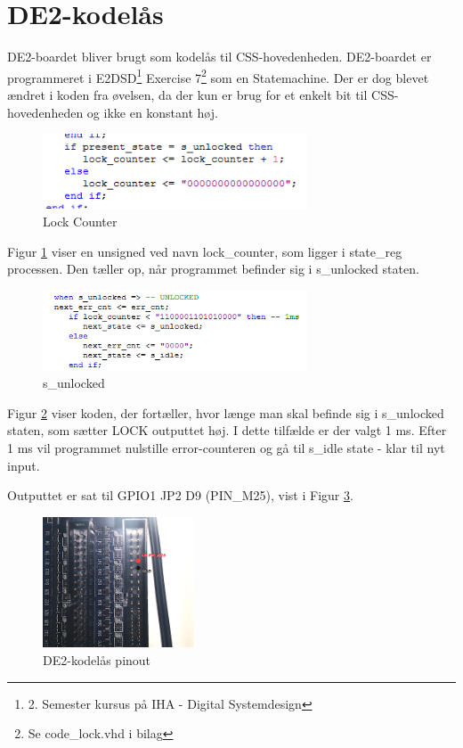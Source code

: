 \section{DE2-kodelås}

DE2-boardet bliver brugt som kodelås til CSS-hovedenheden. DE2-boardet er programmeret i E2DSD\footnote{2. Semester kursus på IHA - Digital Systemdesign} Exercise 7\footnote{Se code\_lock.vhd i bilag} som en Statemachine. Der er dog blevet ændret i koden fra øvelsen, da der kun er brug for et enkelt bit til CSS-hovedenheden og ikke en konstant høj. 

\begin{figure}[H]
	\centering
	\includegraphics[width=0.70\textwidth]{billeder/HWdesign/code_lock_counter}
	\caption{Lock Counter}
	\label{code:code_lock}
\end{figure}

Figur \ref{code:code_lock} viser en unsigned ved navn lock\_counter, som ligger i state\_reg processen. Den tæller op, når programmet befinder sig i s\_unlocked staten.

\begin{figure}[H]
	\centering
	\includegraphics[width=0.70\textwidth]{billeder/HWdesign/code_lock_s_unlocked_state}
	\caption{s\_unlocked}
	\label{code:s_unlocked}
\end{figure}

Figur \ref{code:s_unlocked} viser koden, der fortæller, hvor længe man skal befinde sig i s\_unlocked staten, som sætter LOCK outputtet høj. I dette tilfælde er der valgt 1 ms. Efter 1 ms vil programmet nulstille error-counteren og gå til s\_idle state - klar til nyt input.

Outputtet er sat til GPIO1 JP2 D9 (PIN\_M25), vist i Figur \ref{code:code_lock_pinout}.

\begin{figure}[H]
	\centering
	\includegraphics[width=0.40\textwidth]{billeder/HWdesign/code_lock_pinout}
	\caption{DE2-kodelås pinout}
	\label{code:code_lock_pinout}
\end{figure}
\newpage
